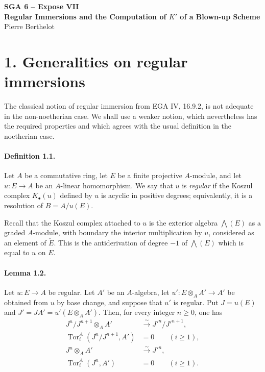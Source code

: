 \documentclass[12pt]{article}
\newcommand{\Tor}{\operatorname{Tor}}
\newcommand{\iso}{\xrightarrow{\sim}}
\begin{document}
\begin{center}
{\Large\textbf{SGA 6 -- Expose VII}}\\[0.35em]
{\large\textbf{Regular Immersions and the Computation of $K'$ of a Blown-up Scheme}}\\[0.25em]
{\normalsize Pierre Berthelot}
\end{center}

\section*{1. Generalities on regular immersions}

The classical notion of regular immersion from EGA IV, 16.9.2, is not adequate in the non-noetherian case. We shall use a weaker notion, which nevertheless has the required properties and which agrees with the usual definition in the noetherian case.

\paragraph{Definition 1.1.} Let $A$ be a commutative ring, let $E$ be a finite projective $A$-module, and let $u:E\to A$ be an $A$-linear homomorphism. We say that $u$ is \emph{regular} if the Koszul complex $K_\bullet(u)$ defined by $u$ is acyclic in positive degrees; equivalently, it is a resolution of $B=A/u(E)$.

Recall that the Koszul complex attached to $u$ is the exterior algebra $\bigwedge(E)$ as a graded $A$-module, with boundary the interior multiplication by $u$, considered as an element of $\check E$. This is the antiderivation of degree $-1$ of $\bigwedge(E)$ which is equal to $u$ on $E$.

\paragraph{Lemma 1.2.} Let $u:E\to A$ be regular. Let $A'$ be an $A$-algebra, let $u':E\otimes_AA'\to A'$ be obtained from $u$ by base change, and suppose that $u'$ is regular. Put $J=u(E)$ and $J'=JA'=u'(E\otimes_AA')$. Then, for every integer $n\geq0$, one has
\begin{align*}
J^n/J^{n+1}\otimes_AA'&\iso J'^n/J'^{n+1},\\
\Tor_i^A(J^n/J^{n+1},A')&=0 \qquad (i\geq1),\\
J^n\otimes_AA'&\iso J'^n,\\
\Tor_i^A(J^n,A')&=0 \qquad (i\geq1).
\end{align*}
\end{document}
